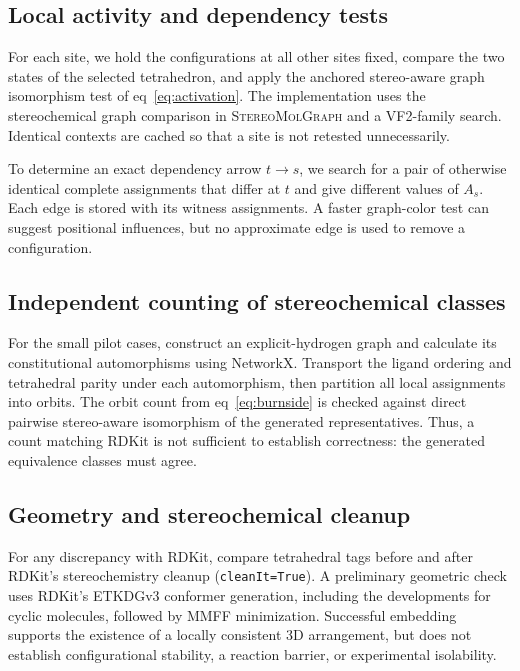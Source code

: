 \documentclass[journal=jcisd8,manuscript=article]{achemso}
\newcommand{\StereoMolGraph}{\textsc{StereoMolGraph}}
\begin{document}
\subsection{Local activity and dependency tests}

For each site, we hold the configurations
at all other sites fixed, compare the two
states of the selected tetrahedron, and
apply the anchored stereo-aware graph
isomorphism test of eq~\ref{eq:activation}.
The implementation uses the stereochemical
graph comparison in \StereoMolGraph{} and
a VF2-family search.\cite{Papusha2026,Cordella2004}
Identical contexts are cached so that a
site is not retested unnecessarily.

To determine an exact dependency arrow
$t\rightarrow s$, we search for a pair
of otherwise identical complete assignments
that differ at $t$ and give different values
of $A_s$. Each edge is stored with its
witness assignments. A faster graph-color
test can suggest positional influences,
but no approximate edge is used to remove
a configuration.\cite{Morgan1965}

\subsection{Independent counting of stereochemical classes}

For the small pilot cases, construct an
explicit-hydrogen graph and calculate its
constitutional automorphisms using
NetworkX.\cite{Hagberg2008}
Transport the ligand ordering and tetrahedral
parity under each automorphism, then
partition all local assignments into orbits.
The orbit count from eq~\ref{eq:burnside}
is checked against direct pairwise
stereo-aware isomorphism of the generated
representatives. Thus, a count matching
RDKit is not sufficient to establish
correctness: the generated equivalence
classes must agree.

\subsection{Geometry and stereochemical cleanup}

For any discrepancy with RDKit, compare
tetrahedral tags before and after RDKit's
stereochemistry cleanup (\texttt{cleanIt=True}).
A preliminary geometric check uses RDKit's
ETKDGv3 conformer generation, including
the developments for cyclic molecules,
followed by MMFF minimization.\cite{Riniker2015,Wang2020,Halgren1996}
Successful embedding supports the
existence of a locally consistent 3D
arrangement, but does not establish
configurational stability, a reaction
barrier, or experimental isolability.
\end{document}
